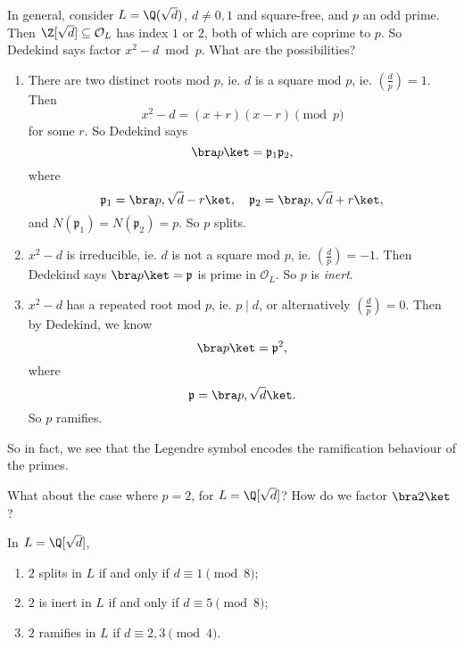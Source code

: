 \documentclass[a4paper]{article}
\begin{document}
In general, consider $L = \Q(\sqrt{d})$, $d \not= 0, 1$ and square-free, and $p$ an odd prime. Then $\Z[\sqrt{d}] \subseteq \mathcal{O}_L$ has index $1$ or $2$, both of which are coprime to $p$. So Dedekind says factor $x^2 - d \bmod p$. What are the possibilities?
\begin{enumerate}
  \item There are two distinct roots mod $p$, ie. $d$ is a square mod $p$, ie. $\left(\frac{d}{p}\right) = 1$. Then
    \[
      x^2 - d = (x + r)(x - r)\pmod p
    \]
    for some $r$. So Dedekind says
    \[
      \bra p\ket = \mathfrak{p}_1 \mathfrak{p}_2,
    \]
    where
    \[
      \mathfrak{p}_1 = \bra p, \sqrt{d} - r\ket,\quad \mathfrak{p}_2 = \bra p, \sqrt{d} + r\ket,
    \]
    and $N(\mathfrak{p}_1) = N(\mathfrak{p}_2) = p$. So $p$ splits.
  \item $x^2 - d$ is irreducible, ie. $d$ is not a square mod $p$, ie. $\left(\frac{d}{p}\right) = -1$. Then Dedekind says $\bra p \ket = \mathfrak{p}$ is prime in $\mathcal{O}_L$. So $p$ is \emph{inert}.
  \item $x^2 - d$ has a repeated root mod $p$, ie. $p \mid d$, or alternatively $\left(\frac{d}{p}\right) = 0$. Then by Dedekind, we know
    \[
      \bra p\ket = \mathfrak{p}^2,
    \]
    where
    \[
      \mathfrak{p} = \bra p, \sqrt{d}\ket.
    \]
    So $p$ ramifies.
\end{enumerate}
So in fact, we see that the Legendre symbol encodes the ramification behaviour of the primes.

What about the case where $p = 2$, for $L = \Q[\sqrt{d}]$? How do we factor $\bra 2\ket$?

\begin{lemma}
  In $L = \Q[\sqrt{d}]$,
  \begin{enumerate}
    \item $2$ splits in $L$ if and only if $d \equiv 1 \pmod 8$;
    \item $2$ is inert in $L$ if and only if $d \equiv 5 \pmod 8$;
    \item $2$ ramifies in $L$ if $d \equiv 2, 3\pmod 4$.
  \end{enumerate}
\end{lemma}
\end{document}
